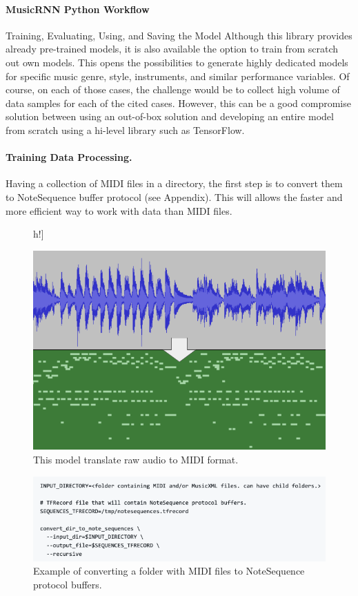 \paragraph{MusicRNN Python Workflow} Training, Evaluating, Using, and Saving the Model
Although this library provides already pre-trained models, it is also available the option
to train from scratch out own models. This opens the possibilities to generate highly
dedicated models for specific music genre, style, instruments, and similar performance
variables. Of course, on each of those cases, the challenge would be to collect high
volume of data samples for each of the cited cases. However, this can be a good compromise
solution between using an out-of-box solution and developing an entire model from scratch
using a hi-level library such as TensorFlow.

\paragraph{Training Data Processing.} Having a collection of MIDI files in a directory, the
first step is to convert them to NoteSequence buffer protocol (see Appendix). This will
allows the faster and more efficient way to work with data than MIDI files.

\begin{figure}[]h!]
  \centering
  \caption{This model translate raw audio to MIDI format.}
  \includegraphics[width=\linewidth]{image/fig_JDF02.png}
\end{figure}

\begin{figure}[h!]
  \centering
  \caption{Example of converting a folder with MIDI files to NoteSequence protocol buffers.}
  \includegraphics[width=\linewidth]{image/fig_JDF03.png}
\end{figure}


